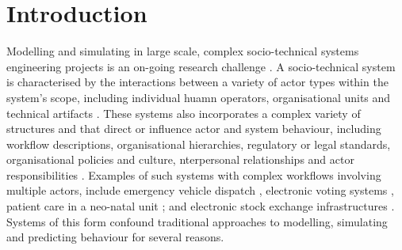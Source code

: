 \documentclass{sig-alternate}
\begin{document}

\section{Introduction}
\label{sec:introduction}


Modelling and simulating in large scale, complex socio-technical systems
engineering projects is an on-going research challenge \citep{baxter08learning}.
A socio-technical system is characterised by the interactions between a variety
of actor types within the system's scope, including individual huamn operators,
organisational units and technical artifacts
\citep{Susman1976,elhassan07role,sommerville08socio}. These systems also
incorporates a complex variety of structures and that direct or influence actor
and system behaviour, including workflow descriptions, organisational
hierarchies, regulatory or legal standards, organisational policies and culture,
nterpersonal relationships and actor responsibilities
\citep{bade07structures,pentland05organisational}. Examples of such systems with
complex workflows involving multiple actors, include emergency vehicle dispatch
\citep{robinson96limited}, electronic voting systems
\citep{bryans04towards,lock07observations}, patient care in a neo-natal unit
\citep{baxter07evaluating}; and electronic stock exchange infrastructures
\citep{cftc-sec10findings}.  Systems of this form confound traditional
approaches to modelling, simulating and predicting behaviour for several
reasons.
\end{document}
